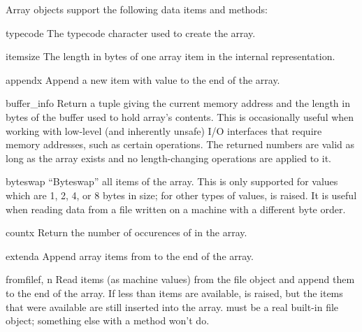 Array objects support the following data items and methods:

\begin{memberdesc}[array]{typecode}
The typecode character used to create the array.
\end{memberdesc}

\begin{memberdesc}[array]{itemsize}
The length in bytes of one array item in the internal representation.
\end{memberdesc}


\begin{methoddesc}[array]{append}{x}
Append a new item with value  to the end of the array.
\end{methoddesc}

\begin{methoddesc}[array]{buffer_info}{}
Return a tuple  giving the current
memory address and the length in bytes of the buffer used to hold
array's contents.  This is occasionally useful when working with
low-level (and inherently unsafe) I/O interfaces that require memory
addresses, such as certain  operations.  The returned
numbers are valid as long as the array exists and no length-changing
operations are applied to it.
\end{methoddesc}

\begin{methoddesc}[array]{byteswap}{}
``Byteswap'' all items of the array.  This is only supported for
values which are 1, 2, 4, or 8 bytes in size; for other types of
values,  is raised.  It is useful when reading
data from a file written on a machine with a different byte order.
\end{methoddesc}

\begin{methoddesc}[array]{count}{x}
Return the number of occurences of  in the array.
\end{methoddesc}

\begin{methoddesc}[array]{extend}{a}
Append array items from  to the end of the array.
\end{methoddesc}

\begin{methoddesc}[array]{fromfile}{f, n}
Read  items (as machine values) from the file object 
and append them to the end of the array.  If less than  items
are available,  is raised, but the items that were
available are still inserted into the array.   must be a real
built-in file object; something else with a  method won't
do.
\end{methoddesc}

